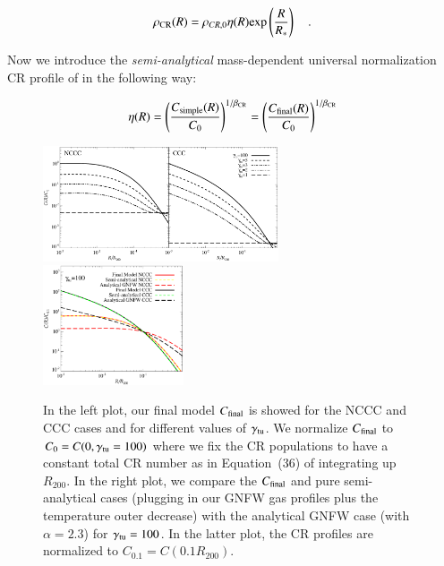 \documentclass[traditabstract]{aa}
\newcommand{\rmn}{\mathrm}
\begin{document}
\begin{equation}
\rho_{\rm{CR}}(R) = \rho_{CR,0} \eta(R) \rmn{exp} \left( \frac{R}{R_{*}} \right) \quad .
\label{eg:rhoCR_1}
\end{equation} 

Now we introduce the \emph{semi-analytical} mass-dependent universal normalization CR profile of \cite{2010MNRAS.409..449P} in the following way:

\begin{equation}
\eta(R) = \left( \frac{C_{\rm{simple}}(R)}{C_0} \right)^{1/\beta_{\rm{CR}}} = \left( \frac{C_{\rm{final}}(R)}{C_0} \right)^{1/\beta_{\rm{CR}}}
\label{eq:eta}
\end{equation} 

\begin{figure}[t]
\centering
\includegraphics[width=0.62\textwidth]{figures/CR_profiles_FinalModel.eps}
\includegraphics[width=0.37\textwidth]{figures/CR_profiles_FinalModelvsREX_norm0.1.eps}
\caption{In the left plot, our final model $C_{\rm{final}}$ is showed for the NCCC and CCC cases and for different values of $\gamma_{\rm{tu}}$. We normalize $C_{\rm{final}}$ to $C_{0}=C(0,\gamma_{\rm{tu}}=100)$ where we fix the CR populations to have a constant total CR number as in Equation~(36) of \cite{2011A&A...527A..99E} integrating up $R_{200}$. In the right plot, we compare the $C_{\rm{final}}$ and pure semi-analytical cases (plugging in our GNFW gas profiles plus the temperature outer decrease) with the analytical GNFW case (with $\alpha=2.3$) for $\gamma_{\rm{tu}}=100$. In the latter plot, the CR profiles are normalized to $C_{0.1}=C(0.1R_{200})$.}
\label{fig:CRFinalModel}
\end{figure}
\end{document}
